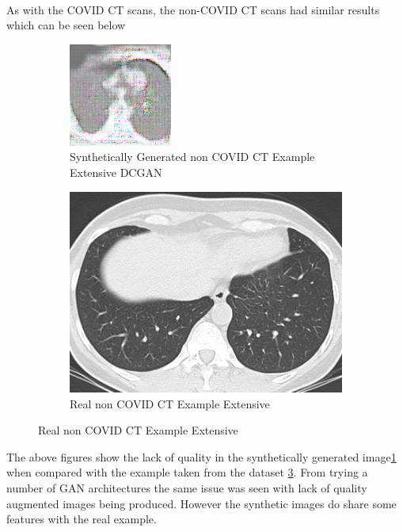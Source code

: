 \\
As with the COVID CT scans, the non-COVID CT scans had similar results which can be seen below
 \begin{figure}[H]
     \begin{subfigure}{.4\textwidth}
    \centering
      \includegraphics[width=.4\linewidth,keepaspectratio]{Images/ExampleOfSyntheticNonCOVIDCTScanExtensiveDCGAN.png}
      \caption{Synthetically Generated non COVID CT Example Extensive DCGAN}
      \label{fig:Synthetically Generated non COVID CT Example Extensive DCGAN}
    \end{subfigure}\hfill%
    \centering
    \begin{subfigure}{.4\textwidth}
    \centering
      \includegraphics[width=.4\linewidth,keepaspectratio]{Images/ExampleOfNonCOVIDCTScan.png}
      \caption{Real non COVID CT Example Extensive}
      \label{fig:Real non COVID CT Example Extensive}
    \end{subfigure}\hfill%
\end{figure}
The above figures show the lack of quality in the synthetically generated image\ref{fig:Synthetically Generated non COVID CT Example Extensive DCGAN} when compared with the example taken from the dataset \ref{fig:Real non COVID CT Example Extensive}. From trying a number of GAN architectures the same issue was seen with lack of quality augmented images being produced.  However the synthetic images do share some features with the real example.
